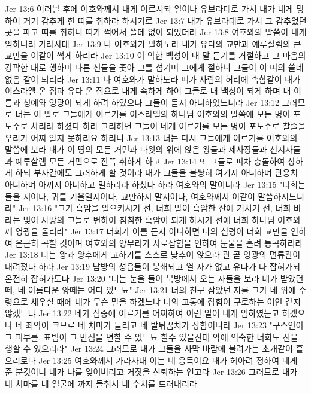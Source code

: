 Jer 13:6  여러날 후에 여호와께서 내게 이르시되 일어나 유브라데로 가서 내가 네게 명하여 거기 감추게 한 띠를 취하라 하시기로
Jer 13:7  내가 유브라데로 가서 그 감추었던 곳을 파고 띠를 취하니 띠가 썩어서 쓸데 없이 되었더라
Jer 13:8  여호와의 말씀이 내게 임하니라 가라사대
Jer 13:9  나 여호와가 말하노라 내가 유다의 교만과 예루살렘의 큰 교만을 이같이 썩게 하리라
Jer 13:10  이 악한 백성이 내 말 듣기를 거절하고 그 마음의 강퍅한 대로 행하며 다른 신들을 좇아 그를 섬기며 그에게 절하니 그들이 이 띠의 쓸데없음 같이 되리라
Jer 13:11  나 여호와가 말하노라 띠가 사람의 허리에 속함같이 내가 이스라엘 온 집과 유다 온 집으로 내게 속하게 하여 그들로 내 백성이 되게 하며 내 이름과 칭예와 영광이 되게 하려 하였으나 그들이 듣지 아니하였느니라
Jer 13:12  그러므로 너는 이 말로 그들에게 이르기를 이스라엘의 하나님 여호와의 말씀에 모든 병이 포도주로 차리라 하셨다 하라 그리하면 그들이 네게 이르기를 모든 병이 포도주로 찰줄을 우리가 어찌 알지 못하리요 하리니
Jer 13:13  너는 다시 그들에게 이르기를 여호와의 말씀에 보라 내가 이 땅의 모든 거민과 다윗의 위에 앉은 왕들과 제사장들과 선지자들과 예루살렘 모든 거민으로 잔뜩 취하게 하고
Jer 13:14  또 그들로 피차 충돌하여 상하게 하되 부자간에도 그러하게 할 것이라 내가 그들을 불쌍히 여기지 아니하며 관용치 아니하며 아끼지 아니하고 멸하리라 하셨다 하라 여호와의 말이니라
Jer 13:15  "너희는 들을 지어다, 귀를 기울일지어다, 교만하지 말지어다, 여호와께서 이같이 말씀하시느니라"
Jer 13:16  "그가 흑암을 일으키시기 전, 너희 발이 흑암한 산에 거치기 전, 너희 바라는 빛이 사망의 그늘로 변하여 침침한 흑암이 되게 하시기 전에 너희 하나님 여호와께 영광을 돌리라"
Jer 13:17  너희가 이를 듣지 아니하면 나의 심령이 너희 교만을 인하여 은근히 곡할 것이며 여호와의 양무리가 사로잡힘을 인하여 눈물을 흘려 통곡하리라
Jer 13:18  너는 왕과 왕후에게 고하기를 스스로 낮추어 앉으라 관 곧 영광의 면류관이 내려졌다 하라
Jer 13:19  남방의 성읍들이 봉쇄되고 열 자가 없고 유다가 다 잡혀가되 온전히 잡혀가도다
Jer 13:20  "너는 눈을 들어 북방에서 오는 자들을 보라 네가 받았던 떼, 네 아름다운 양떼는 어디 있느뇨"
Jer 13:21  너의 친구 삼았던 자를 그가 네 위에 수령으로 세우실 때에 네가 무슨 말을 하겠느냐 너의 고통에 잡힘이 구로하는 여인 같지 않겠느냐
Jer 13:22  네가 심중에 이르기를 어찌하여 이런 일이 내게 임하였는고 하겠으나 네 죄악이 크므로 네 치마가 들리고 네 발뒤꿈치가 상함이니라
Jer 13:23  "구스인이 그 피부를, 표범이 그 반점을 변할 수 있느뇨 할수 있을진대 악에 익숙한 너희도 선을 행할 수 있으리라"
Jer 13:24  그러므로 내가 그들을 사막 바람에 불려가는 초개같이 흩으리로다
Jer 13:25  여호와께서 가라사대 이는 네 응득이요 내가 헤아려 정하여 네게 준 분깃이니 네가 나를 잊어버리고 거짓을 신뢰하는 연고라
Jer 13:26  그러므로 내가 네 치마를 네 얼굴에 까지 들춰서 네 수치를 드러내리라
